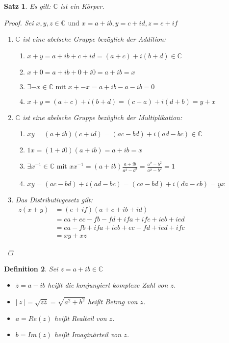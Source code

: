 \documentclass[a4paper,titlepage,oneside]{article}
\def\C{\ensuremath{\mathbb{C}} }
\def\im{\ensuremath{\mathit{i}} }
\newcommand{\abs}[1]{\ensuremath{\left|\:#1\:\right|}}
\theoremstyle{thmstyle}
\newtheorem{satz}{Satz}[subsection]
\newtheorem{defi}[satz]{Definition}
\begin{document}
\newpage
\begin{satz}
Es gilt:  \C ist ein Körper.
\begin{proof} Sei \( x,y,z \in \C \text{ und } x = a + \im b, y = c + \im d, z = e + \im f \)
\begin{enumerate}[label=\Roman*)]
\item \C ist eine abelsche Gruppe bezüglich der Addition:
\begin{enumerate}[label=\roman*)]
\item \( x + y = a + \im b + c + \im d = (a+c) + \im (b + d) \in \C\)
\item \(x + 0 = a + \im b + 0 + \im 0 = a + \im b = x \)
\item \( \exists -x \in \C \text{ mit } x + -x = a + \im b - a -\im b = 0 \)
\item \( x+y =  (a+c) + \im (b + d) =  (c + a) + \im (d + b) = y + x \)
\end{enumerate}
\item \C ist eine abelsche Gruppe bezüglich der Multiplikation:
\begin{enumerate}[label=\roman*)]
\item \( xy = (a + \im b)(c + \im d) = (ac - bd) + \im (ad - bc) \in \C\)
\item \( 1x = (1+\im 0)(a + \im b ) = a + \im b = x \)
\item \( \exists x^{-1} \in \C \text{ mit } xx^{-1} = (a + \im b)\frac{a + \im b}{a^2 - b^2} = \frac{a^2 - b^2}{a^2 - b^2} = 1\)
\item \( xy = (ac - bd) + \im (ad - bc) = (ca - bd) + \im (da - cb) = yx\)
\end{enumerate}
\item Das Distributivgesetz gilt:\\
 \begin{math}\begin{aligned} z (x + y) &= (e + \im f)( a+c + \im b + \im d) \\
 &= ea + ec - fb - fd + \im fa +\im fc + \im eb + \im ed \\
 &= ea - fb + \im fa + \im eb + ec - fd + \im ed + \im fc \\
 &= xy + xz\end{aligned}\end{math}
\end{enumerate}
\end{proof}
\end{satz}

\begin{defi}
Sei \( z = a + \im b \in \C \)
\begin{itemize}
\item \(\overline{z} = a - \im b \) heißt die konjungiert komplexe Zahl von $z$.
\item \(\abs{z} = \sqrt{z \overline{z}} = \sqrt{a^2 + b^2}\) heißt Betrag von \(z\).
\item $a = Re(z)$ heißt Realteil von $z$.
\item $b = Im(z)$ heißt Imaginärteil von $z$.
\end{itemize}
\end{defi}
\end{document}
